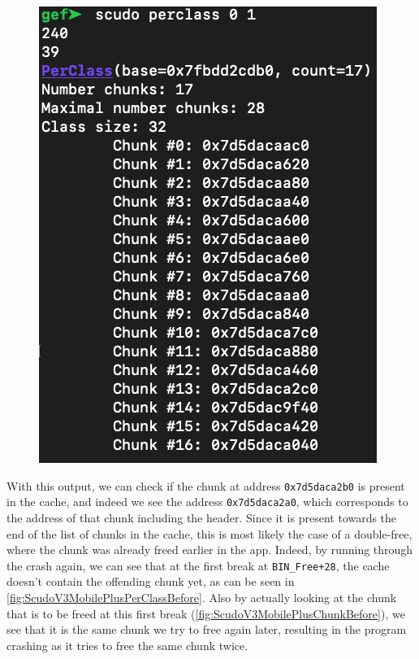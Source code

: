 \documentclass[a4paper,11pt,oneside]{report}
\begin{document}
\begin{figure}[h!]
\begin{minipage}{.5\textwidth}
  \label{fig:ScudoV3MobilePlusPerClassAfter}
\end{minipage}%
\begin{minipage}{.5\textwidth}
  \centering
  \includegraphics[width=.95\linewidth]{figures/ScudoV3MobilePlusPerClassBefore.png}
  \label{fig:ScudoV3MobilePlusPerClassBefore}
\end{minipage}
\end{figure}

With this output, we can check if the chunk at address \verb|0x7d5daca2b0| is
present in the cache, and indeed we see the address \verb|0x7d5daca2a0|, which
corresponds to the address of that chunk including the header. Since it is
present towards the end of the list of chunks in the cache, this is most likely
the case of a double-free, where the chunk was already freed earlier in the app.
Indeed, by running through the crash again, we can see that at the first break at
\verb|BIN_Free+28|, the cache doesn't contain the offending chunk yet, as can be
seen in \autoref{fig:ScudoV3MobilePlusPerClassBefore}. Also by actually looking
at the chunk that is to be freed at this first break (\autoref{fig:ScudoV3MobilePlusChunkBefore}),
we see that it is the same chunk we try to free again later, resulting in the
program crashing as it tries to free the same chunk twice.
\end{document}
